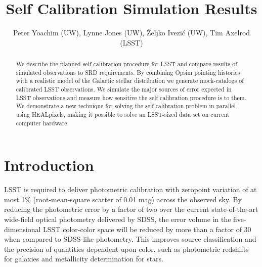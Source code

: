 \documentclass[12pt,preprint]{aastex}
\begin{document}
\title{Self Calibration Simulation Results}
\author{Peter Yoachim (UW), Lynne Jones (UW),
\v{Z}eljko Ivezi\'{c} (UW), Tim Axelrod (LSST)}

\begin{abstract}
We describe the planned self calibration procedure for LSST and compare results of simulated observations to SRD requirements.  By combining Opsim pointing histories with a realistic model of the Galactic stellar distribution we generate mock-catalogs of calibrated LSST observations.  We simulate the major sources of error expected in LSST observations and measure how sensitive the self calibration procedure is to them.  We demonstrate a new technique for solving the self calibration problem in parallel using HEALpixels, making it possible to solve an LSST-sized data set on current computer hardware.
\end{abstract}


\section{Introduction}


LSST is required to deliver photometric calibration with zeropoint
variation of at most 1\% (root-mean-square scatter of 0.01 mag) across
the observed sky.  By reducing the photometric error by a factor of
two over the current state-of-the-art wide-field optical photometry
delivered by SDSS, the error volume in the five-dimensional LSST
color-color space will be reduced by more than a factor of 30 when
compared to SDSS-like photometry. This improves source classification
and the precision of quantities dependent upon color, such as
photometric redshifts for galaxies and metallicity determination for
stars.
\end{document}
